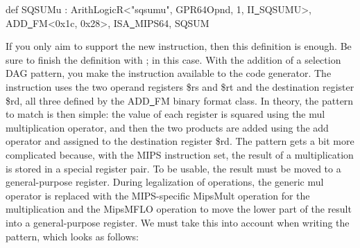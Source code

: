 \begin{tcolorbox}[colback=white,colframe=black]
def SQSUMu : ArithLogicR<"sqsumu", GPR64Opnd, 1, II\underline{~}SQSUMU>, \\
\hspace*{4cm}ADD\underline{~}FM<0x1c, 0x28>, ISA\underline{~}MIPS64, SQSUM
\end{tcolorbox}

If you only aim to support the new instruction, then this definition is enough. Be sure to finish the definition with ; in this case. With the addition of a selection DAG pattern, you make the instruction available to the code generator. The instruction uses the two operand registers \$rs and \$rt and the destination register \$rd, all three defined by the ADD\underline{~}FM binary format class. In theory, the pattern to match is then simple: the value of each register is squared using the mul multiplication operator, and then the two products are added using the add operator and assigned to the destination register \$rd. The pattern gets a bit more complicated because, with the MIPS instruction set, the result of a multiplication is stored in a special register pair. To be usable, the result must be moved to a general-purpose register. During legalization of operations, the generic mul operator is replaced with the MIPS-specific MipsMult operation for the multiplication and the MipsMFLO operation to move the lower part of the result into a general-purpose register. We must take this into account when writing the pattern, which looks as follows:\par

\begin{tcolorbox}[colback=white,colframe=black]
{
\hspace*{0.5cm}let Pattern = [(set GPR64Opnd:\$rd, \\
\hspace*{4cm}(add (MipsMFLO (MipsMult \\
\hspace*{4.5cm}GPR64Opnd:\$rs, \\
\\
\hspace*{4.5cm}GPR64Opnd:\$rs)), \\
\hspace*{5.5cm}(MipsMFLO (MipsMult \\
\hspace*{6cm}GPR64Opnd:\$rt, \\
\\
\hspace*{6cm}GPR64Opnd:\$rt))) \\
\hspace*{4.5cm})];\\
\}
\end{tcolorbox}

